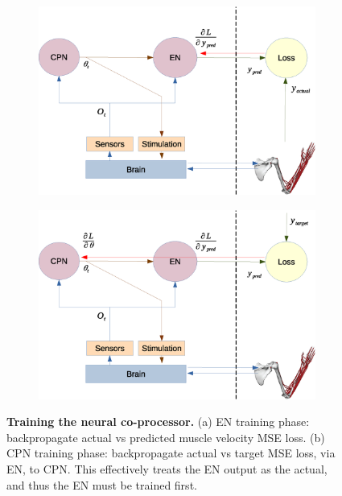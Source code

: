 \documentclass[12pt]{iopart}
\begin{document}
\begin{figure}
	\centering
	\begin{subfigure}[c]{0.48\textwidth}
		\centering
		\includegraphics[width=\textwidth]{backprop_en.eps}
		\caption{}
	\end{subfigure}
	\hfill
	\begin{subfigure}[c]{0.48\textwidth}
		\centering
		\includegraphics[width=\textwidth]{backprop_cpn.eps}
		\caption{}
	\end{subfigure}
	\hfill
\caption{\textbf{Training the neural co-processor.} (a) EN training phase: 
         backpropagate actual vs predicted muscle velocity MSE loss.
         (b) CPN training phase: backpropagate actual vs target
         MSE loss, via EN, to CPN. This effectively treats the EN
         output as the actual, and thus the EN must be trained first.}
\label{fig:training}
\end{figure}
\end{document}

